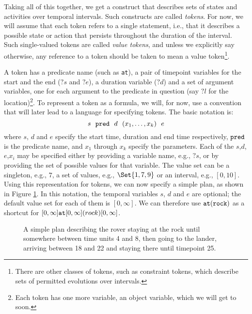 Taking all of this together, we get a construct that describes sets of
states and activities over temporal intervals.  Such constructs are
called {\em tokens}.  For now, we will assume that each token refers
to a single statement, i.e., that it describes a possible state or
action that persists throughout the duration of the interval.  Such
single-valued tokens are called {\em value tokens}, and unless we
explicitly say otherwise, any reference to a token should be taken to
mean a value token\footnote{There are other classes of tokens, such as
constraint tokens, which describe sets of permitted evolutions over
intervals.}.

A token has a predicate name (such as {\tt at}), a pair of timepoint
variables for the start and the end ($?s$ and $?e$), a duration
variable ($?d$) and a set of argument variables, one for each argument
to the predicate in question (say $?l$ for the location)\footnote{Each
token has one more variable, an object variable, which we will get to
soon.}.  To represent a token as a formula, we will, for now, use a
convention that will later lead to a language for specifying tokens.
The basic notation is:
  $$s \ \  {\tt pred} \ \  d \ \  (x_1, \ldots, x_k) \ \ e$$
where $s$, $d$ and $e$ specify the start time, duration and end time
respectively, ${\tt pred}$ is the predicate name, and $x_1$ through
$x_k$ specify the parameters.  Each of the $s$,$d$,$e$,$x_i$ may be
specified either by providing a variable name, e.g., $?s$, or by
providing the set of possible values for that variable.  The value set
can be a singleton, e.g., $7$, a set of values, e.g., $\Set{1,7,9}$ or
an interval, e.g., $[0,10]$.  Using this representation for tokens, we
can now specify a simple plan, as shown in Figure \ref{simpleRAPlan}. 
In this notation, the temporal variables $s$, $d$ and $e$ are
optional; the default value set for each of them is $[0,\infty]$.  We
can therefore use ${\tt at(rock)}$ as a shortcut for $[0,\infty] {\tt
at} [0,\infty] (rock) [0,\infty]$.


\begin{figure}[btph]
\centerline{
}
\caption{\label{simpleRAPlan} A simple plan describing the rover staying at the rock
until somewhere between time units 4 and 8, then going to the lander,
arriving between 18 and 22 and staying there until timepoint 25.}
\end{figure}

